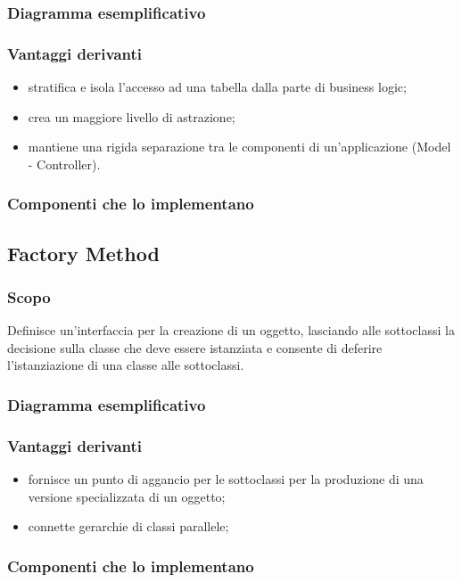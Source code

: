 \subsubsection{Diagramma esemplificativo}
\subsubsection{Vantaggi derivanti}
\begin{itemize}
\item stratifica e isola l'accesso ad una tabella dalla parte di business logic;
\item crea un maggiore livello di astrazione;
\item mantiene una rigida separazione tra le componenti di un'applicazione (Model - Controller).
\end{itemize}
\subsubsection{Componenti che lo implementano}

\subsection{Factory Method}
\subsubsection{Scopo}
Definisce un'interfaccia per la creazione di un oggetto, lasciando alle sottoclassi la decisione sulla classe che deve essere istanziata e consente di deferire l'istanziazione di una classe alle sottoclassi.
\subsubsection{Diagramma esemplificativo}
\subsubsection{Vantaggi derivanti}
\begin{itemize}
\item fornisce un punto di aggancio per le sottoclassi per la produzione di una versione specializzata di un oggetto;
\item connette gerarchie di classi parallele;
\end{itemize}
\subsubsection{Componenti che lo implementano}

